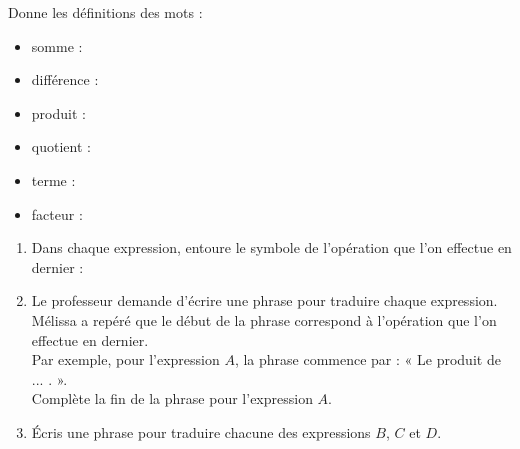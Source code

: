 \begin{methode*1}
\begin{exemple*1}

Donne les définitions des mots : 
\begin{itemize}
\item somme : \dotfill
\item différence :\dotfill
\item produit :\dotfill
\item quotient :\dotfill
\item terme :\dotfill
\item facteur :\dotfill
\end{itemize}
\end{exemple*1}

\exercice

\begin{enumerate}
\item
Dans chaque expression, entoure le symbole de l'opération que l'on effectue en dernier :


\item
Le professeur demande d'écrire une phrase pour traduire chaque expression. Mélissa a repéré que le début de la phrase correspond à l'opération que l'on effectue en dernier.\\
Par exemple, pour l'expression $A$, la phrase commence par : « Le produit de ... . ».\\
Complète la fin de la phrase pour l'expression $A$.


\item
Écris une phrase pour traduire chacune des expressions $B$, $C$ et $D$.

\end{enumerate}

\end{methode*1}
